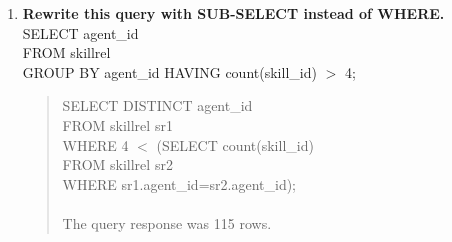 \documentclass{article}
\begin{document}
\begin{enumerate}
\item
\textbf{Rewrite this query with SUB-SELECT instead of WHERE.\\}
SELECT agent\_id\\
FROM skillrel\\
GROUP BY agent\_id HAVING count(skill\_id) $>$ 4;\\
\begin{quote}
SELECT DISTINCT agent\_id\\
FROM skillrel sr1\\
WHERE 4 $<$ (SELECT count(skill\_id)\\
\hspace*{2cm}FROM skillrel sr2\\
\hspace*{2cm}WHERE sr1.agent\_id=sr2.agent\_id);\\
\\
The query response was 115 rows.
\end{quote}

\end{enumerate}
\end{document}
